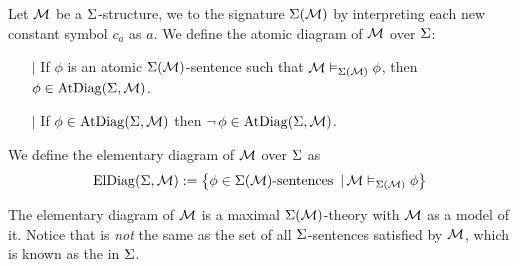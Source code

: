 \begin{dfn}
    Let $\mathcal{M}$ be a $\Sigma$-structure,
    we  to the signature $\Sigma(\mathcal{M})$
    by interpreting each new constant symbol $c_a$ as $a$.
    We define the atomic diagram of $\mathcal{M}$ over $\Sigma$:
    \begin{itemize}
        \item[$\vert$] If $\phi$ is an atomic
        $\Sigma(\mathcal{M})$-sentence such that $\mathcal{M} \vDash_{\Sigma(\mathcal{M})} \phi$,
        then $\phi \in \mathrm{AtDiag}(\Sigma,\mathcal{M})$.
        \item[$\vert$] If $\phi \in \mathrm{AtDiag}(\Sigma,\mathcal{M})$ then 
        $\neg\, \phi \in \mathrm{AtDiag}(\Sigma,\mathcal{M})$.
    \end{itemize}
    We define the elementary diagram of $\mathcal{M}$ over $\Sigma$ as 
    \[
        \mathrm{ElDiag}(\Sigma,\mathcal{M}) := 
        \left\{\phi \in \Sigma(\mathcal{M})\text{-sentences } \,|\, \mathcal{M} \vDash_{\Sigma(\mathcal{M})} \phi\right\}
    \]

    The elementary diagram of $\mathcal{M}$ is a maximal $\Sigma(\mathcal{M})$-theory 
    with $\mathcal{M}$ as a model of it.
    Notice that is \textit{not} the same as the set of all 
    $\Sigma$-sentences satisfied by $\mathcal{M}$,
    which is known as the 
     in $\Sigma$.
\end{dfn}

